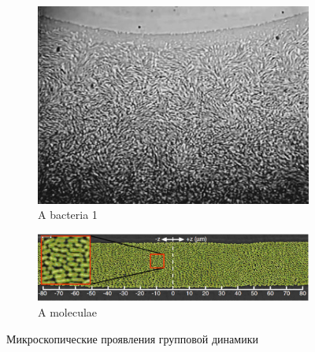     \begin{figure}
    	\centering
        \begin{subfigure}{0.3\textwidth}
                \includegraphics[width=\textwidth]{Images/Fig11_CollectiveMotion}
                \caption{A bacteria 1}
                \label{fig:CollMot:bacteria}
        \end{subfigure}
        \begin{subfigure}{0.5\textwidth}
                \includegraphics[width=\textwidth]{Images/Fig15_CollectiveMotion_part}
                \caption{A moleculae}
                \label{fig:CollMot:moleculae}
        \end{subfigure}
        \caption{Микроскопические проявления групповой динамики}
        \label{fig:CollMot:microscpoic}
    \end{figure}
